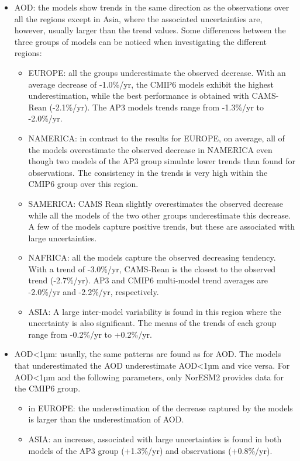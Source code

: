 \documentclass[journal abbreviation, manuscript]{copernicus}
\begin{document}
\begin{itemize}
 \item AOD: the models show trends in the same direction as the observations over all the regions except in Asia, where the associated uncertainties are, however, usually larger than the trend values. Some differences between the three groups of models can be noticed when investigating the different regions:
       \begin{itemize}
        \item EUROPE: all the groups underestimate the observed decrease. With an average decrease of -1.0\%/yr, the CMIP6 models exhibit the highest underestimation, while the best performance is obtained with CAMS-Rean (-2.1\%/yr). The AP3 models trends range from -1.3\%/yr to -2.0\%/yr.
        \item NAMERICA: in contrast to the results for EUROPE, on average, all of the models overestimate the observed decrease in NAMERICA even though two models of the AP3 group simulate lower trends than found for observations. The consistency in the trends is very high within the CMIP6 group over this region.
        \item SAMERICA: CAMS Rean slightly overestimates the observed decrease while all the models of the two other groups underestimate this decrease. A few of the models capture positive trends, but these are associated with large uncertainties.
        \item NAFRICA: all the models capture the observed decreasing tendency. With a trend of -3.0\%/yr, CAMS-Rean is the closest to the observed trend (-2.7\%/yr). AP3 and CMIP6 multi-model trend averages are -2.0\%/yr and -2.2\%/yr, respectively.
        \item ASIA: A large inter-model variability is found in this region where the uncertainty is also significant. The means of the trends of each group range from -0.2\%/yr to +0.2\%/yr.
       \end{itemize}
 \item AOD<1µm: usually, the same patterns are found as for AOD. The models that underestimated the AOD underestimate AOD<1µm and vice versa. For AOD<1µm and the following parameters, only NorESM2 provides data for the CMIP6 group.
       \begin{itemize}
        \item in EUROPE: the underestimation of the decrease captured by the models is larger than the underestimation of AOD.
        \item ASIA: an increase, associated with large uncertainties is found in both models of the AP3 group (+1.3\%/yr) and observations (+0.8\%/yr).

\end{itemize}
\end{itemize}
\end{document}
